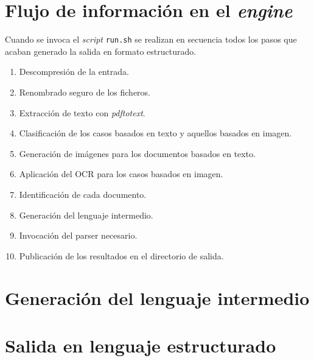 
\section{Flujo de información en el \emph{engine}}

Cuando se invoca el \emph{script} \verb|run.sh| se realizan en secuencia todos los pasos que acaban generado la salida en formato estructurado.

\begin{enumerate}
    \item Descompresión de la entrada.
    \item Renombrado seguro de los ficheros.
    \item Extracción de texto con \emph{pdftotext}.
    \item Clasificación de los casos basados en texto y aquellos basados en imagen.
    \item Generación de imágenes para los documentos basados en texto.
    \item Aplicación del OCR para los casos basados en imagen.
    \item Identificación de cada documento.
    \item Generación del lenguaje intermedio.
    \item Invocación del parser necesario.
    \item Publicación de los resultados en el directorio de salida.
\end{enumerate}

\section{Generación del lenguaje intermedio}
\section{Salida en lenguaje estructurado}